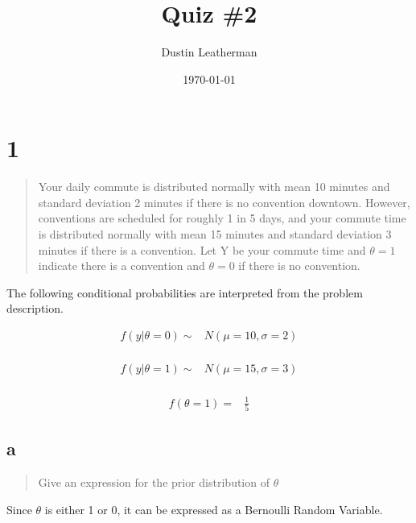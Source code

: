 \documentclass[11pt]{article}
\author{Dustin Leatherman}
\date{\today}
\title{Quiz \#2}
\begin{document}
\maketitle

\section{1}
\label{sec:orgb687392}
\begin{quote}
Your daily commute is distributed normally with mean 10 minutes and standard
deviation 2 minutes if there is no convention downtown. However, conventions are
scheduled for roughly 1 in 5 days, and your commute time is distributed normally
with mean 15 minutes and standard deviation 3 minutes if there is a convention.
Let Y be your commute time and \(\theta = 1\) indicate there is a convention and
\(\theta = 0\) if there is no convention.
\end{quote}

The following conditional probabilities are interpreted from the problem description.

\begin{equation}
\begin{split}
f(y | \theta = 0) \sim & N(\mu = 10, \sigma = 2) \label{eq:1}\\
\end{split}
\end{equation}

\begin{equation}
\begin{split}
f(y | \theta = 1) \sim & N(\mu = 15, \sigma = 3) \label{eq:2}\\
\end{split}
\end{equation}

\begin{equation}
\begin{split}
f( \theta = 1) = & \frac{1}{5} \label{eq:3}
\end{split}
\end{equation}

\subsection{a}
\label{sec:org2b1946e}

\begin{quote}
Give an expression for the prior distribution of \(\theta\)
\end{quote}

Since \(\theta\) is either 1 or 0, it can be expressed as a Bernoulli Random
Variable.
\end{document}
